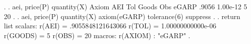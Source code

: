 . 
. aei, price(P) quantity(X)
{\smallskip}
       Axiom {\VBAR}       AEI        Tol      Goods        Obs 
       eGARP {\VBAR}     .9056   1.00e-12          5         20 
{\smallskip}
. 
. aei, price(P) quantity(X) axiom(eGARP) tolerance(6) suppress
{\smallskip}
. 
. return list
{\smallskip}
scalars:
                r(AEI) =  .9055848121643066
                r(TOL) =  1.00000000000e-06
              r(GOODS) =  5
                r(OBS) =  20
{\smallskip}
macros:
              r(AXIOM) : "eGARP"
{\smallskip}
. 
